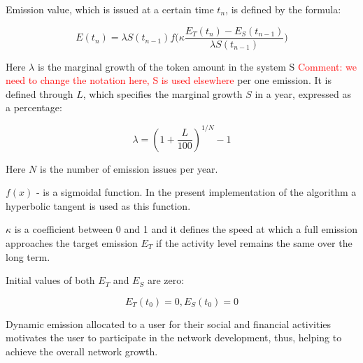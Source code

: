 \documentclass[a4paper,12pt]{article}
\begin{document}
Emission value, which is issued at a certain time $t_n$, is defined by the formula:



$$
    E(t_n) = \lambda S(t_{n-1}) f \Big( \kappa \frac {E_T(t_n) - E_S(t_{n-1})}{\lambda S(t_{n-1})} \Big)
$$

Here $\lambda$ is the marginal growth of the token amount in the system S \textcolor{red}{Comment: we need to change the notation here, S is used elsewhere} per one emission. It is defined through $L$, which specifies the marginal growth $S$ in a year, expressed as a percentage:



$$
    \lambda = (1 + \frac{L}{100})^{1/N}-1
$$

Here $N$ is the number of emission issues per year.



$f(x)$ - is a sigmoidal function. In the present implementation of the algorithm a hyperbolic tangent is used as this function. 


$\kappa$ is a coefficient between 0 and 1 and it defines the speed at which a full emission approaches the target emission $E_T$ if the activity level remains the same over the long term.



Initial values of both $E_T$ and $E_S$ are zero:



$$
E_T(t_0)=0, E_S(t_0)=0
$$



Dynamic emission allocated to a user for their social and financial activities motivates the user to participate in the network development, thus, helping to achieve the overall network growth.

%
%
\end{document}
